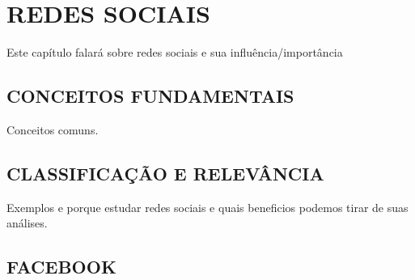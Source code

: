 
\chapter{REDES SOCIAIS}
\label{chap:redesSociais}
Este capítulo falará sobre redes sociais e sua influência/importância

\section{CONCEITOS FUNDAMENTAIS}
\label{sec:conceitosRedesSociais}
Conceitos comuns.

\section{CLASSIFICAÇÃO E RELEVÂNCIA}
\label{sec:classRedesSociais}
Exemplos e porque estudar redes sociais e quais beneficios podemos tirar de suas análises.

\section{FACEBOOK}
\label{sec:facebookRedesSociais}